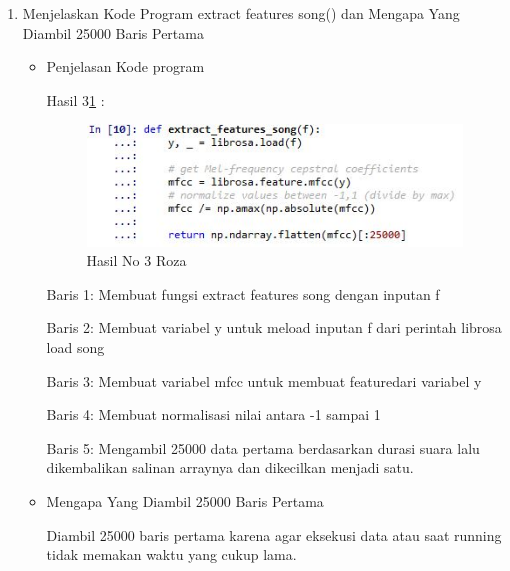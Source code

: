 \begin{enumerate}
\item Menjelaskan Kode Program extract features song() dan Mengapa Yang Diambil 25000 Baris Pertama
\begin{itemize}
\item Penjelasan Kode program

\par Hasil 3\ref{hasil3} :
\begin{figure}[!hbtp]
\centering
\includegraphics[scale=0.7]{figures/no3roza.jpg}
\caption{Hasil No 3 Roza}
\label{hasil3}
\end{figure}
\par Baris 1: Membuat fungsi extract features song dengan inputan f
\par Baris 2: Membuat variabel y untuk meload inputan f dari perintah librosa load song
\par Baris 3: Membuat variabel mfcc untuk membuat featuredari variabel y
\par Baris 4: Membuat normalisasi nilai antara -1 sampai 1
\par Baris 5: Mengambil 25000 data pertama berdasarkan durasi suara lalu dikembalikan salinan arraynya  dan dikecilkan menjadi satu.
\item Mengapa Yang Diambil 25000 Baris Pertama
\par Diambil 25000 baris pertama karena agar eksekusi data atau saat running tidak memakan waktu yang cukup lama.
\end{itemize}


\end{enumerate}
